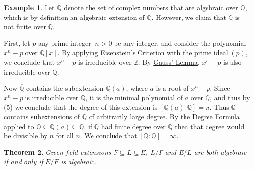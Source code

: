 \documentclass[12pt]{report}
\newtheorem{theorem}{Theorem}[chapter]
\numberwithin{equation}{section}
\numberwithin{theorem}{chapter}
\theoremstyle{definition}
\newtheorem{example}[theorem]{Example}
\newtheorem*{basic properties}{Basic Properties}
\newtheorem*{Important Remark}{Important Remark}
\newcommand{\Z}{\mathbb{Z}}
\newcommand{\Q}{\mathbb{Q}}
\begin{document}
\begin{example}\label{example closure of Q}
Let $\overline{\Q}$ denote the set of complex numbers that are algebraic over $\Q$, which is by definition an algebraic extension of $\Q$. However, we claim that $\overline{\Q}$ is not finite over $\Q$. 

First, let $p$ any prime integer, $n>0$ be any integer, and consider the polynomial $x^n-p$ over $\Q[x]$. By applying \hyperref[eisenstein criterion]{Eisenstein's Criterion} with the prime ideal $(p)$, we conclude that $x^n-p$ is irreducible over $\Z$. By \hyperref[Gauss Lemma]{Gauss' Lemma}, $x^n-p$ is also irreducible over $\Q$. 

Now $\overline{\Q}$ contains the subextension $\Q(a)$, where $a$ is a root of $x^n-p$. Since $x^n-p$ is irreducible over $\Q$, it is the minimal polynomial of $a$ over $\Q$, and thus by  (5) we conclude that the degree of this extension is $[\Q(a):\Q]=n$. Thus $\Q$ contains subextensions of $\Q$ of arbitrarily large degree. By the \hyperref[deg formula]{Degree Formula} applied to $\Q \subseteq \Q(a) \subseteq \overline{\Q}$, if $\overline{\Q}$ had finite degree over $\Q$ then that degree would be divisible by $n$ for all $n$. We conclude that $[\Q : \Q] = \infty$.
\end{example}


\begin{theorem}\label{algebraictower}
Given field extensions $F \subseteq L \subseteq E$, $L/F$ and $E/L$ are both algebraic if and only if $E/F$ is algebraic.
\end{theorem}
\end{document}
